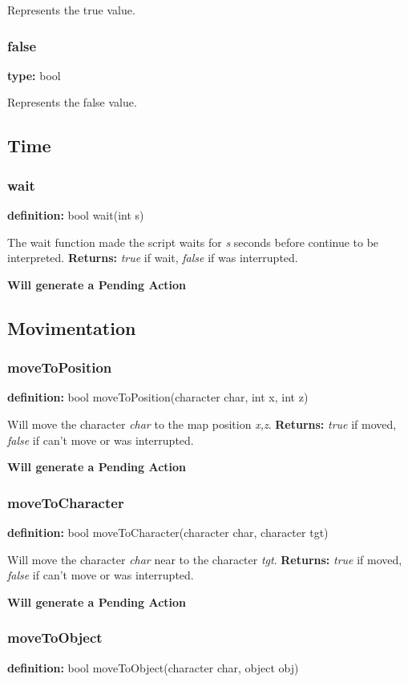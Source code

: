 \documentclass[ letterpaper,12pt]{article}
\begin{document}
Represents the true value.

\subsubsection{false}
{\bf type:} bool

Represents the false value.

\subsection{Time}

\subsubsection{wait}
{\bf definition:} bool wait(int s)

The wait function made the script waits for {\it s} seconds before continue to be
interpreted. {\bf Returns:} {\it true} if wait, {\it false} if was interrupted.

{\bf Will generate a Pending Action}

\subsection{Movimentation}

\subsubsection{moveToPosition}
{\bf definition:} bool moveToPosition(character char, int x, int z)

Will move the character {\it char} to the map position {\it x,z}. {\bf Returns:} 
{\it true} if moved, {\it false} if can't move or was interrupted.

{\bf Will generate a Pending Action}

\subsubsection{moveToCharacter}
{\bf definition:} bool moveToCharacter(character char, character tgt)

Will move the character {\it char} near to the character {\it tgt}. {\bf Returns:} 
{\it true} if moved, {\it false} if can't move or was interrupted.

{\bf Will generate a Pending Action}

\subsubsection{moveToObject}
{\bf definition:} bool moveToObject(character char, object obj)
\end{document}
